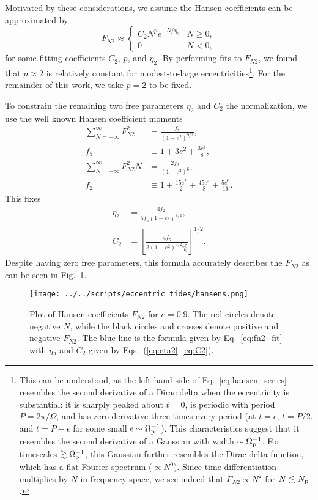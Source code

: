 \documentclass[
        fleqn,
        usenatbib,
    ]{mnras}
\newcommand*{\p}[1]{\left(#1\right)}
\newcommand*{\s}[1]{\left[#1\right]}
\begin{document}
Motivated by these considerations, we assume the Hansen coefficients can be
approximated by
\begin{equation}
    F_{N2} \approx
    \begin{cases}
        C_2 N^{p}e^{-N/\eta_2} & N \geq 0,\\
        0 & N < 0,
    \end{cases}\label{eq:fn2_fit}
\end{equation}
for some fitting coefficients $C_2$, $p$, and $\eta_2$. By performing fits to
$F_{N2}$, we found that $p \approx 2$ is relatively constant for modest-to-large
eccentricities\footnote{This can be understood, as the left hand side of
Eq.~\eqref{eq:hansen_series} resembles the second derivative of a Dirac delta
when the eccentricity is substantial: it is sharply peaked about $t = 0$, is
periodic with period $P = 2\pi / \Omega$, and has zero derivative three times
every period (at $t = \epsilon$, $t = P / 2$, and $t = P - \epsilon$ for some
small $\epsilon \sim \Omega_{\rm p}^{-1}$). This characteristics suggest that it
resembles the second derivative of a Gaussian with width $\sim \Omega_{\rm
p}^{-1}$. For timescales $\gtrsim \Omega_{\rm p}^{-1}$, this Gaussian further
resembles the Dirac delta function, which has a flat Fourier spectrum ($\propto
N^0$). Since time differentiation multiplies by $N$ in frequency space, we see
indeed that $F_{N2} \propto N^2$ for $N \lesssim N_{\rm p}$.}. For
the remainder of this work, we
take $p = 2$ to be fixed.

To constrain the remaining two free parameters $\eta_2$ and $C_2$ the
normalization, we use the well known Hansen coefficient moments
\citep{hut81}
\begin{align}
    \sum\limits_{N = -\infty}^\infty F_{N2}^2 &= \frac{f_5}{\p{1 - e^2}^{9/2}},
        \\
    f_5 &\equiv 1 + 3e^2 + \frac{3e^4}{8},\\
    \sum\limits_{N = -\infty}^\infty F_{N2}^2N
        &= \frac{2f_2}{\p{1 - e^2}^6},\\
    f_2 &\equiv 1 + \frac{15e^2}{2}
            + \frac{45 e^4}{8} + \frac{5e^6}{16}.
\end{align}
This fixes
\begin{align}
    \eta_2 &= \frac{4f_2}{5f_5\p{1 - e^2}^{3/2}},\label{eq:eta2}\\
    C_2 &= \s{\frac{4f_5}{3\p{1 - e^2}^{9/2}\eta_2^5}}^{1/2}.\label{eq:C2}
\end{align}
Despite having zero free parameters, this formula accurately describes the
$F_{N2}$ as can be seen in Fig.~\ref{fig:hansens}.
\begin{figure}
    \centering
    \texttt{[image: ../../scripts/eccentric\_tides/hansens.png]}
    \caption{Plot of Hansen coefficients $F_{N2}$ for $e = 0.9$. The red circles
    denote negative $N$, while the black circles and crosses denote positive and
    negative $F_{N2}$. The blue line is the formula given by
    Eq.~\eqref{eq:fn2_fit} with $\eta_2$ and $C_2$ given by
    Eqs.~(\ref{eq:eta2}--\ref{eq:C2}). }\label{fig:hansens}
\end{figure}
\end{document}
